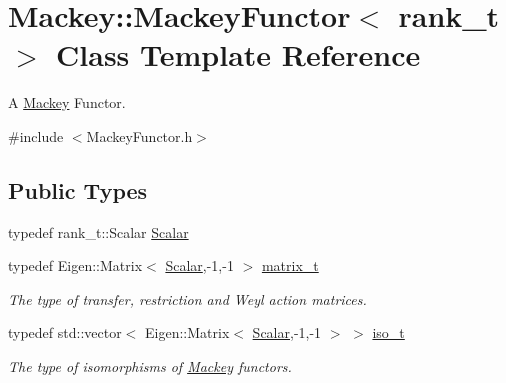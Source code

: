 \hypertarget{classMackey_1_1MackeyFunctor}{}\section{Mackey\+:\+:Mackey\+Functor$<$ rank\+\_\+t $>$ Class Template Reference}
\label{classMackey_1_1MackeyFunctor}


A \hyperlink{namespaceMackey}{Mackey} Functor.  




{\ttfamily \#include $<$Mackey\+Functor.\+h$>$}

\subsection*{Public Types}
\begin{DoxyCompactItemize}
\item 
typedef rank\+\_\+t\+::\+Scalar \hyperlink{classMackey_1_1MackeyFunctor_a124b4175216c4cf9a4b67acc78e9246d}{Scalar}
\item 
typedef Eigen\+::\+Matrix$<$ \hyperlink{classMackey_1_1MackeyFunctor_a124b4175216c4cf9a4b67acc78e9246d}{Scalar},-\/1,-\/1 $>$ \hyperlink{classMackey_1_1MackeyFunctor_a271550bc911da5c842bbc90d8bf87973}{matrix\+\_\+t}
\begin{DoxyCompactList}\small\item\em The type of transfer, restriction and Weyl action matrices. \end{DoxyCompactList}\item 
typedef std\+::vector$<$ Eigen\+::\+Matrix$<$ \hyperlink{classMackey_1_1MackeyFunctor_a124b4175216c4cf9a4b67acc78e9246d}{Scalar},-\/1,-\/1 $>$ $>$ \hyperlink{classMackey_1_1MackeyFunctor_a53637e79f2502411ba085d2b2a61bb67}{iso\+\_\+t}
\begin{DoxyCompactList}\small\item\em The type of isomorphisms of \hyperlink{namespaceMackey}{Mackey} functors. \end{DoxyCompactList}\end{DoxyCompactItemize}
